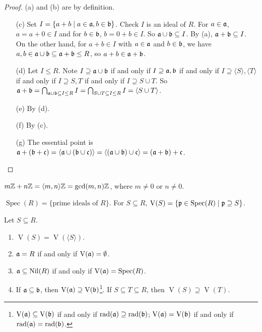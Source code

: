 \begin{proof}
    (a) and (b) are by definition.
    \begin{enumerate}
        \item [(c)]
            Set $I = \{a+b \mid a \in \mathfrak{a},b \in \mathfrak{b}\}$. Check $I$ is an ideal of $R$. For $a \in \mathfrak{a}$, $a = a + 0 \in I$ and for $b \in \mathfrak{b}$, $b = 0 + b \in I$. So $\mathfrak{a} \cup \mathfrak{b} \subseteq I$. By (a), $\mathfrak{a} + \mathfrak{b} \subseteq I$. On the other hand, for $a+b \in I$ with $a \in \mathfrak{a}$ and $b \in \mathfrak{b}$, we have $a,b \in \mathfrak{a} \cup \mathfrak{b} \subseteq \mathfrak{a} + \mathfrak{b} \leq R$, so $a + b \in \mathfrak{a} + \mathfrak{b}$.
        \item[(d)] Let $I \leq R$. Note $I \supseteq \mathfrak{a} \cup \mathfrak{b}$ if and only if $I \supseteq \mathfrak{a},\mathfrak{b}$ if and only if $I \supseteq \langle S \rangle, \langle T \rangle$ if and only if $I \supseteq S,T$ if and only if $I \supseteq S \cup T$. So $\mathfrak{a} + \mathfrak{b} = \bigcap_{\mathfrak{a} \cup \mathfrak{b} \subseteq I \leq R} I = \bigcap_{S \cup T \subseteq I \leq R} I = \langle S \cup T \rangle$.
        \item[(e)] By (d).
        \item[(f)] By (c).
        \item[(g)] The essential point is $\mathfrak{a} + (\mathfrak{b} + \mathfrak{c}) = \langle \mathfrak{a} \cup (\mathfrak{b} \cup \mathfrak{c}) \rangle = \langle (\mathfrak{a} \cup \mathfrak{b}) \cup \mathfrak{c} \rangle = (\mathfrak{a} + \mathfrak{b}) + \mathfrak{c}$. \qedhere
    \end{enumerate}
\end{proof}

\begin{example*}
    $m\mathbb{Z} + n\mathbb{Z} = \langle m,n \rangle\mathbb{Z} = \operatorname{gcd}(m,n)\mathbb{Z}$, where $m \neq 0$ or $n \neq 0$.
\end{example*}

\begin{recall*}
    $\operatorname{Spec}(R) = \{\text{prime ideals of $R$}\}$. For $S \subseteq R$, $\operatorname{V}(S) = \{\mathfrak{p} \in \operatorname{Spec}(R) \mid \mathfrak{p} \supseteq S\}$.
\end{recall*}

\begin{proposition}\label{1.32}
    Let $S \subseteq R$.
    \begin{enumerate}
        \item\label{1.32a} $\operatorname{V}(S) = \operatorname{V}(\langle S \rangle)$. 
        \item\label{1.32b} $\mathfrak{a} = R$ if and only if $\operatorname{V}(\mathfrak{a}) = \emptyset$.
        \item\label{1.32c} $\mathfrak{a} \subseteq \operatorname{Nil}(R)$ if and only if $\operatorname{V}(\mathfrak{a}) = \operatorname{Spec}(R)$.
        \item\label{1.32d} If $\mathfrak{a} \subseteq \mathfrak{b}$, then $\operatorname{V}(\mathfrak{a}) \supseteq \operatorname{V}(\mathfrak{b})$\footnote[2]{$\operatorname{V}(\mathfrak{a}) \subseteq \operatorname{V}(\mathfrak{b})$ if and only if $\operatorname{rad}(\mathfrak{a}) \supseteq \operatorname{rad}(\mathfrak{b})$; $\operatorname{V}(\mathfrak{a}) = \operatorname{V}(\mathfrak{b})$ if and only if $\operatorname{rad}(\mathfrak{a}) = \operatorname{rad}(\mathfrak{b})$.}. If $S \subseteq T \subseteq R$, then $\operatorname{V}(S) \supseteq \operatorname{V}(T)$.
    \end{enumerate}
\end{proposition}

